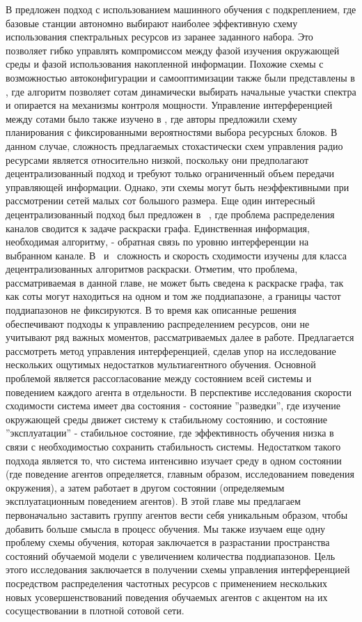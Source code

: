 В \cite{mab} предложен подход с использованием машинного обучения с подкреплением, где базовые станции автономно выбирают наиболее эффективную схему использования спектральных ресурсов из заранее заданного набора. Это позволяет гибко управлять компромиссом между фазой изучения окружающей среды и фазой использования накопленной информации. Похожие схемы с возможностью автоконфигурации и самооптимизации также были представлены в \cite{local-area}, где алгоритм позволяет сотам динамически выбирать начальные участки спектра и опирается на механизмы контроля мощности. Управление интерференцией между сотами было также изучено в \cite{on-uplink}, где авторы предложили схему планирования с фиксированными вероятностями выбора ресурсных блоков. В данном случае, сложность предлагаемых стохастически схем управления радио ресурсами является относительно низкой, поскольку они предполагают децентрализованный подход и требуют только ограниченный объем передачи управляющей информации. Однако, эти схемы могут быть неэффективными при рассмотрении сетей малых сот большого размера.
Еще один интересный децентрализованный подход был предложен в ~\cite{1666484}, где проблема распределения каналов сводится к задаче раскраски графа. Единственная информация, необходимая алгоритму, - обратная связь по уровню интерференции на выбранном канале. В~\cite{Duffy:2008:CAD:1377038.1377164} и ~\cite{4177619}сложность и скорость сходимости изучены для класса децентрализованных алгоритмов раскраски. Отметим, что проблема, рассматриваемая в данной главе, не может быть сведена к раскраске графа, так как соты могут находиться на одном и том же поддиапазоне, а границы частот поддиапазонов не фиксируются.
В то время как описанные решения обеспечивают подходы к управлению распределением ресурсов, они не учитывают ряд важных моментов, рассматриваемых далее в работе. Предлагается рассмотреть метод управления интерференцией, сделав упор на исследование нескольких ощутимых недостатков мультиагентного обучения. Основной проблемой является рассогласование между состоянием всей системы и поведением каждого агента в отдельности. В перспективе исследования скорости сходимости система имеет два состояния - состояние ''разведки'', где изучение окружающей среды движет систему к стабильному состоянию, и состояние ''эксплуатации'' - стабильное состояние, где эффективность обучения низка в связи с необходимостью сохранить стабильность системы. Недостатком такого подхода является то, что система интенсивно изучает среду в одном состоянии (где поведение агентов определяется, главным образом, исследованием поведения окружения), а затем работает в другом состоянии (определяемым эксплуатационным поведением агентов). В этой главе мы предлагаем первоначально заставить группу агентов вести себя уникальным образом, чтобы добавить больше смысла в процесс обучения. Мы также изучаем еще одну проблему схемы обучения, которая заключается в разрастании пространства состояний обучаемой модели с увеличением количества поддиапазонов.
Цель этого исследования заключается в получении схемы управления интерференцией посредством распределения частотных ресурсов с применением нескольких новых усовершенствований поведения обучаемых агентов с акцентом на их сосуществовании в плотной сотовой сети.

